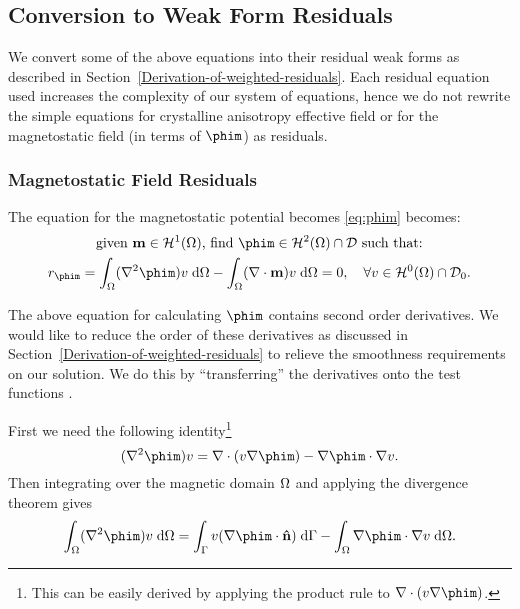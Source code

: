 




\subsection{Conversion to Weak Form Residuals}

We convert some of the above equations into their residual weak forms as described in Section~\ref{Derivation-of-weighted-residuals}. Each residual equation used increases the complexity of our system of equations, hence we do not rewrite the simple equations for crystalline anisotropy effective field or for the magnetostatic field (in terms of $\phim$) as residuals.


\subsubsection{Magnetostatic Field Residuals}
\label{sec:magn-field-resid}

The equation for the magnetostatic potential becomes \eqref{eq:phim} becomes:
\begin{gather}
  \text{given $\mv \in \sob^1(\magd)$, find $\phim \in \sob^2(\magd) \cap \Dfs$ such that:} \notag \\
  r_{\phim} = \int_\magd (\nabla^2 \phim) v  \d \magd
  - \int_\magd (\nabla \cdot \mv) v \d \magd = 0,
  \quad \forall v \in \sob^0(\magd) \cap \Dfs_0. \label{eqn:phires1}
\end{gather}

The above equation for calculating $\phim$ contains second order derivatives.
We would like to reduce the order of these derivatives as discussed in Section~\ref{Derivation-of-weighted-residuals} to relieve the smoothness requirements on our solution.
We do this by ``transferring'' the derivatives onto the test functions \cite{HowardElmanDavidSilvester2006}.

First we need the following identity\footnote{This can be easily derived by applying the product rule to $\nabla \cdot (v \nabla \phim)$.}
\begin{equation}
  (\nabla^2 \phim) v =
  \nabla \cdot (v \nabla \phim)
  - \nabla \phim \cdot \nabla v.
  \label{eq:20}
\end{equation}
Then integrating over the magnetic domain $\Omega$ and applying the divergence theorem gives
\begin{equation}
  \int_\magd (\nabla^2 \phim) v \d \magd =
  \int_{\boundd} v (\nabla \phim \cdot \nv) \d \boundd
  - \int_\magd \nabla \phim \cdot \nabla v \d \magd.
  \label{eqn:identitygauss}
\end{equation}

